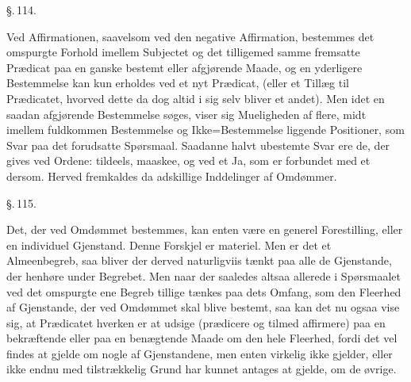 \documentclass[12pt]{book}
\def\textit#1{#1}%
\def\emph#1{#1}%
\newcommand{\parag}[1]{%
  \par\vspace{0.9\baselineskip}%
  {\centering\textit{\S.\,#1.}\par}%
  \vspace{0.35\baselineskip}%
  \noindent\hspace{\parindent}\ignorespaces
}
\newcommand{\opage}[1]{\marginnote{\footnotesize\textit{[#1]}}}
\begin{document}
\parag{114}

Ved Affirmationen, saavelsom ved den negative Affirmation, bestemmes det omspurgte
Forhold imellem Subjectet og det tilligemed samme fremsatte Prædicat paa en ganske
bestemt eller afgjørende Maade, og en yderligere Bestemmelse kan kun erholdes ved et
nyt Prædicat, (eller et Tillæg til Prædicatet, hvorved dette da dog altid i sig selv
bliver et andet). Men idet en saadan afgjørende Bestemmelse søges, viser sig
Mueligheden af flere, midt imellem fuldkommen Bestemmelse og Ikke=Bestemmelse
liggende Positioner, som Svar paa det forudsatte
\opage{277} Spørsmaal. Saadanne halvt ubestemte Svar ere de, der gives ved Ordene: tildeels,
maaskee, og ved et Ja, som er forbundet med et dersom. Herved fremkaldes da adskillige
Inddelinger af Omdømmer.

\parag{115}

Det, der ved Omdømmet bestemmes, kan enten være en generel Forestilling, eller en
individuel Gjenstand. Denne Forskjel er materiel. Men er det et Almeenbegreb, saa
bliver der derved naturligviis tænkt paa alle de Gjenstande, der henhøre under
Begrebet. Men naar der saaledes altsaa allerede i Spørsmaalet ved det omspurgte ene
Begreb tillige tænkes paa dets Omfang, som den \emph{Fleerhed} af Gjenstande, der ved
Omdømmet skal blive bestemt, saa kan det nu ogsaa vise sig, at Prædicatet hverken er at
udsige (prædicere og tilmed affirmere) paa en bekræftende eller paa en benægtende Maade
om den hele \emph{Fleerhed}, fordi det vel findes at gjelde om nogle af Gjenstandene,
men enten virkelig ikke gjelder, eller ikke endnu med tilstrækkelig Grund har kunnet
antages at gjelde, om de øvrige.
\end{document}
